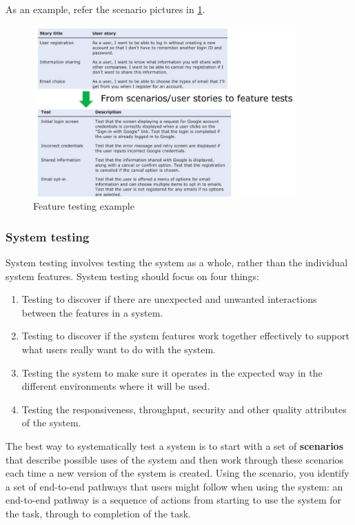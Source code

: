\documentclass[10pt,a4paper]{report}
\begin{document}
As an example, refer the scenario pictures in \ref{image106}.
\begin{figure}[h]
	\centering
	\includegraphics[width=0.9\textwidth]{image106}
	\caption{Feature testing example}
	\label{image106}
\end{figure} 

\subsubsection{System testing}
 System testing involves testing the system as a whole, rather than the individual system features. System testing should focus on four things:
 \begin{enumerate}
 	\item Testing to discover if there are unexpected and unwanted interactions between
 	the features in a system.
 	\item Testing to discover if the system features work together effectively to support
 	what users really want to do with the system.
 	\item Testing the system to make sure it operates in the expected way in the different
 	environments where it will be used.
 	\item Testing the responsiveness, throughput, security and other quality attributes of
 	the system.
 \end{enumerate}
The best way to systematically test a system is to start with a set of
\textbf{scenarios} that describe possible uses of the system and then work through these scenarios each time a new version of the system is created.
Using the scenario, you identify a set of end-to-end pathways that users
might follow when using the system: an end-to-end pathway is a sequence of actions from starting to use the system for the task, through to completion of the task.
\end{document}
